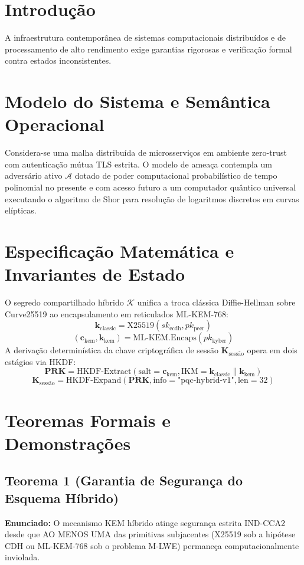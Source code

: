 \documentclass[
  article,
  12pt,
  oneside,
  a4paper,
  english,
  brazil
]{abntex2}
\begin{document}
\section{Introdução}
A infraestrutura contemporânea de sistemas computacionais distribuídos e de processamento de alto rendimento exige garantias rigorosas e verificação formal contra estados inconsistentes.

\section{Modelo do Sistema e Semântica Operacional}
Considera-se uma malha distribuída de microsserviços em ambiente zero-trust com autenticação mútua TLS estrita. O modelo de ameaça contempla um adversário ativo $\mathcal{A}$ dotado de poder computacional probabilístico de tempo polinomial no presente e com acesso futuro a um computador quântico universal executando o algoritmo de Shor para resolução de logaritmos discretos em curvas elípticas.

\section{Especificação Matemática e Invariantes de Estado}
O segredo compartilhado híbrido $\mathcal{K}$ unifica a troca clássica Diffie-Hellman sobre Curve25519 ao encapsulamento em reticulados ML-KEM-768:
$$\mathbf{k}_{\text{classic}} = \text{X25519}(sk_{\text{ecdh}}, pk_{\text{peer}})$$
$$(\mathbf{c}_{\text{kem}}, \mathbf{k}_{\text{kem}}) = \text{ML-KEM.Encaps}(pk_{\text{kyber}})$$
A derivação determinística da chave criptográfica de sessão $\mathbf{K}_{\text{sessão}}$ opera em dois estágios via HKDF:
$$\mathbf{PRK} = \text{HKDF-Extract}\left( \text{salt}=\mathbf{c}_{\text{kem}}, \text{IKM}=\mathbf{k}_{\text{classic}} \parallel \mathbf{k}_{\text{kem}} \right)$$
$$\mathbf{K}_{\text{sessão}} = \text{HKDF-Expand}\left( \mathbf{PRK}, \text{info}=\text{"pqc-hybrid-v1"}, \text{len}=32 \right)$$

\section{Teoremas Formais e Demonstrações}
\subsection{Teorema 1 (Garantia de Segurança do Esquema Híbrido)}
\textbf{Enunciado:} O mecanismo KEM híbrido atinge segurança estrita IND-CCA2 desde que AO MENOS UMA das primitivas subjacentes (X25519 sob a hipótese CDH ou ML-KEM-768 sob o problema M-LWE) permaneça computacionalmente inviolada.
\end{document}
